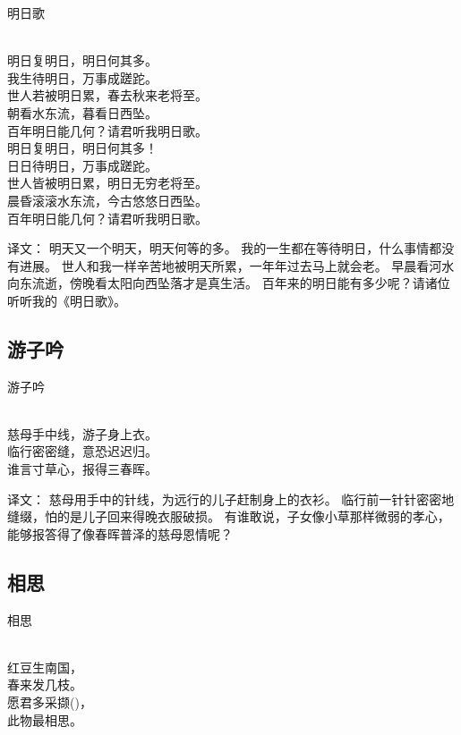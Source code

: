 \noindent 明日歌

  \\

\noindent 明日复明日，明日何其多。\\
我生待明日，万事成蹉跎。\\
世人若被明日累，春去秋来老将至。\\
朝看水东流，暮看日西坠。\\
百年明日能几何？请君听我明日歌。\\
明日复明日，明日何其多！\\
日日待明日，万事成蹉跎。\\
世人皆被明日累，明日无穷老将至。\\
晨昏滚滚水东流，今古悠悠日西坠。\\
百年明日能几何？请君听我明日歌。

译文：
明天又一个明天，明天何等的多。 我的一生都在等待明日，什么事情都没有进展。 世人和我一样辛苦地被明天所累，一年年过去马上就会老。 早晨看河水向东流逝，傍晚看太阳向西坠落才是真生活。 百年来的明日能有多少呢？请诸位听听我的《明日歌》。

\subsection{游子吟}

\noindent 游子吟

  \\

\noindent 慈母手中线，游子身上衣。\\
临行密密缝，意恐迟迟归。\\
谁言寸草心，报得三春晖。

译文：
慈母用手中的针线，为远行的儿子赶制身上的衣衫。
临行前一针针密密地缝缀，怕的是儿子回来得晚衣服破损。
有谁敢说，子女像小草那样微弱的孝心，能够报答得了像春晖普泽的慈母恩情呢？

\subsection{相思}

\noindent 相思

  \\

\noindent 红豆生南国，\\春来发几枝。\\
愿君多采撷()，\\此物最相思。

